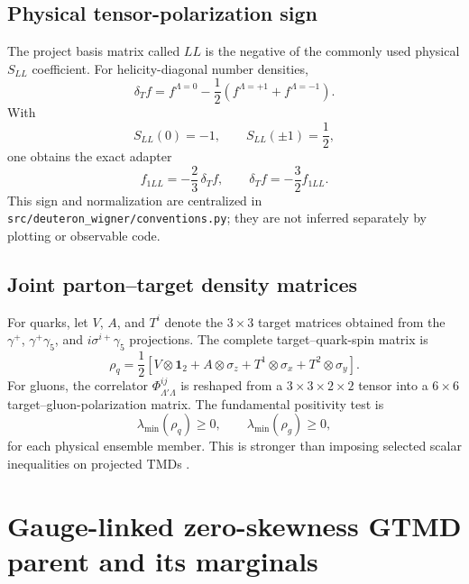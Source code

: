 \documentclass[11pt,oneside]{book}
\newcommand{\codepath}[1]{\nolinkurl{#1}}
\begin{document}
\section{Physical tensor-polarization sign}

The project basis matrix called $LL$ is the negative of the commonly used physical $S_{LL}$ coefficient.  For helicity-diagonal number densities,
\begin{equation}
 \delta_T f
 =f^{\Lambda=0}-\frac12\left(f^{\Lambda=+1}+f^{\Lambda=-1}\right).
 \label{eq:deltaT-def}
\end{equation}
With
\begin{equation}
 S_{LL}(0)=-1,\qquad S_{LL}(\pm1)=\frac12,
\end{equation}
one obtains the exact adapter
\begin{equation}
 \boxed{f_{1LL}=-\frac23\,\delta_T f},
 \qquad
 \delta_T f=-\frac32 f_{1LL}.
 \label{eq:f1ll-adapter}
\end{equation}
This sign and normalization are centralized in \codepath{src/deuteron_wigner/conventions.py}; they are not inferred separately by plotting or observable code.

\section{Joint parton--target density matrices}

For quarks, let $V$, $A$, and $T^i$ denote the $3\times3$ target matrices obtained from the $\gamma^+$, $\gamma^+\gamma_5$, and $i\sigma^{i+}\gamma_5$ projections.  The complete target--quark-spin matrix is
\begin{equation}
 \rho_q
 =\frac12\left[
 V\otimes\mathbf 1_2
 +A\otimes\sigma_z
 +T^1\otimes\sigma_x
 +T^2\otimes\sigma_y
 \right].
 \label{eq:quark-joint-density}
\end{equation}
For gluons, the correlator $\Phi_{\Lambda'\Lambda}^{ij}$ is reshaped from a $3\times3\times2\times2$ tensor into a $6\times6$ target--gluon-polarization matrix.  The fundamental positivity test is
\begin{equation}
 \lambda_{\min}(\rho_q)\geq0,
 \qquad
 \lambda_{\min}(\rho_g)\geq0,
 \label{eq:joint-positivity}
\end{equation}
for each physical ensemble member.  This is stronger than imposing selected scalar inequalities on projected TMDs \cite{CotognoVanDaalMulders2017}.

\chapter{Gauge-linked zero-skewness GTMD parent and its marginals}
\label{chap:gtmd}
\end{document}
